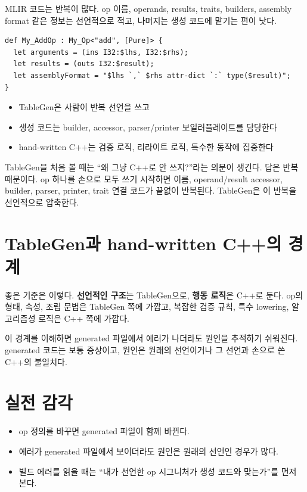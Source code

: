 \documentclass[11pt,a4paper]{book}
\DeclareRobustCommand{\code}[1]{\texttt{\detokenize{#1}}}
\newcommand{\term}[1]{\textbf{#1}}
\begin{document}
MLIR 코드는 반복이 많다. op 이름, operands, results, traits, builders, assembly format 같은 정보는 선언적으로 적고, 나머지는 생성 코드에 맡기는 편이 낫다.

\begin{lstlisting}[style=cpp,title={개념적 예시: TableGen이 표현하는 것}]
def My_AddOp : My_Op<"add", [Pure]> {
  let arguments = (ins I32:$lhs, I32:$rhs);
  let results = (outs I32:$result);
  let assemblyFormat = "$lhs `,` $rhs attr-dict `:` type($result)";
}
\end{lstlisting}

\begin{summarybox}
\begin{itemize}[nosep]
\item TableGen은 사람이 반복 선언을 쓰고
\item 생성 코드는 builder, accessor, parser/printer 보일러플레이트를 담당한다
\item hand-written C++는 검증 로직, 리라이트 로직, 특수한 동작에 집중한다
\end{itemize}
\end{summarybox}

TableGen을 처음 볼 때는 ``왜 그냥 C++로 안 쓰지?''라는 의문이 생긴다. 답은 반복 때문이다. op 하나를 손으로 모두 쓰기 시작하면 이름, operand/result accessor, builder, parser, printer, trait 연결 코드가 끝없이 반복된다. TableGen은 이 반복을 선언적으로 압축한다.

\section{TableGen과 hand-written C++의 경계}

좋은 기준은 이렇다. \term{선언적인 구조}는 TableGen으로, \term{행동 로직}은 C++로 둔다. op의 형태, 속성, 조립 문법은 TableGen 쪽에 가깝고, 복잡한 검증 규칙, 특수 lowering, 알고리즘성 로직은 C++ 쪽에 가깝다.

이 경계를 이해하면 generated 파일에서 에러가 나더라도 원인을 추적하기 쉬워진다. generated 코드는 보통 증상이고, 원인은 원래의 \code{.td} 선언이거나 그 선언과 손으로 쓴 C++의 불일치다.

\section{실전 감각}

\begin{itemize}[nosep]
\item op 정의를 바꾸면 generated 파일이 함께 바뀐다.
\item 에러가 generated 파일에서 보이더라도 원인은 원래의 \code{.td} 선언인 경우가 많다.
\item 빌드 에러를 읽을 때는 ``내가 선언한 op 시그니처가 생성 코드와 맞는가''를 먼저 본다.
\end{itemize}
\end{document}
